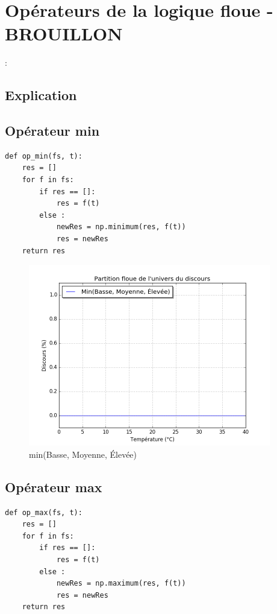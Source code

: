 \documentclass[a4paper]{article}
\begin{document}
\section{Opérateurs de la logique floue -BROUILLON}:

\subsection{Explication}

\subsection{Opérateur min}
\begin{lstlisting}
def op_min(fs, t):
    res = []
    for f in fs:
        if res == []:
            res = f(t)
        else :
            newRes = np.minimum(res, f(t))
            res = newRes
    return res
\end{lstlisting}

\begin{figure}[h]
\begin{center}
	\includegraphics[width=400px]{plot_test_min.png}
\end{center}
\caption{min(Basse, Moyenne, Élevée)}
\end{figure}

\subsection{Opérateur max}
\begin{lstlisting}
def op_max(fs, t):
    res = []
    for f in fs:
        if res == []:
            res = f(t)
        else :
            newRes = np.maximum(res, f(t))
            res = newRes
    return res
\end{lstlisting}
\end{document}

